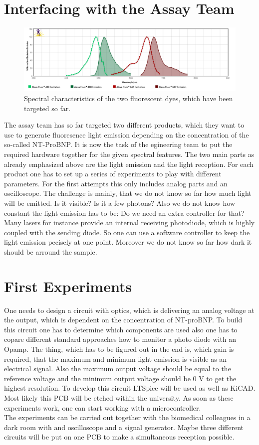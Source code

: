 \documentclass{report}
\newcommand{\newpar}{\vspace{1em}\\}
\begin{document}
\section{Interfacing with the Assay Team}
\begin{figure}[H]
	\includegraphics[width=\textwidth]{./fig/spectra.png}
	\caption{Spectral characteristics of the two fluorescent dyes, which have been targeted so far.}
	\label{fig:assays}
\end{figure}
The assay team has so far targeted two different products, which they want to use to generate fluoresence light emission depending on the concentration of the so-called NT-ProBNP. It is now the task of the egineering team to put the required hardware together for the given spectral features. The two main parts as already emphasized above are the light emission and the light reception. For each product one has to set up a series of experiments to play with different parameters. For the first attempts this only includes analog parts and an oscilloscope. The challenge is mainly, that we do not know so far    how much light will be emitted. Is it visible? Is it a few photons? Also we do not know how constant the light emission has to be: Do we need an extra controller for that? Many lasers for instance provide an internal receiving photodiode, which is highly coupled with the sending diode. So one can use a software controller to keep the light emission pecisely at one point. Moreover we do not know so far how dark it should be arround the sample. 

\section{First Experiments}
One needs to design a circuit with optics, which is delivering an analog voltage at the output, which is dependent on the concentration of NT-proBNP. To build this circuit one has to determine which components are used also one has to copare different standard approaches how to monitor a photo diode with an Opamp. The thing, which has to be figured out in the end is, which gain is required, that the maximum and minimum light emission is visible as an electrical signal. Also the maximum output voltage should be equal to the reference voltage and the minimum output voltage should be 0 V to get the highest resolution. To develop this circuit LTSpice will be used as well as KiCAD. Most likely this PCB will be etched within the university. As soon as these experiments work, one can start working with a microcontroller. 
\newpar
The experiments can be carried out together with the biomedical colleagues in a dark room with and oscilloscope and a signal generator. Maybe three different circuits will be put on one PCB to make a simultaneous reception possible.  
\end{document}
